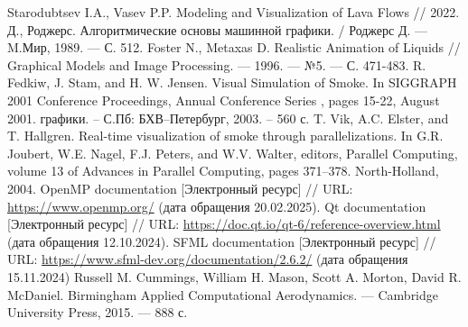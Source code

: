 \begin{thebibliography}{}
	 Starodubtsev I.A., Vasev P.P. Modeling and Visualization of Lava Flows // 2022.
	 Д., Роджерс. Алгоритмические основы машинной графики. / Роджерс Д.
	— M.Мир, 1989. — С. 512. 
	 Foster N., Metaxas D. Realistic Animation of Liquids // Graphical Models and Image Processing. --- 1996. --- №5. --- С. 471-483.
	R. Fedkiw, J. Stam, and H. W. Jensen. Visual Simulation of Smoke. In SIGGRAPH 2001 Conference Proceedings, Annual Conference Series , pages 15-22, August 2001.
	графики. – С.Пб: БХВ–Петербург, 2003. – 560 с.
	 T. Vik, A.C. Elster, and T. Hallgren. Real-time visualization of smoke through parallelizations. In
	G.R. Joubert, W.E. Nagel, F.J. Peters, and W.V. Walter, editors, Parallel Computing, volume 13 of Advances in Parallel Computing, pages 371–378. North-Holland, 2004.
	 OpenMP documentation [Электронный ресурс] // URL: \url{https://www.openmp.org/} (дата обращения 20.02.2025).
	 Qt documentation [Электронный ресурс] // URL: \url{https://doc.qt.io/qt-6/reference-overview.html} (дата обращения 12.10.2024).
	 SFML documentation [Электронный ресурс] // URL: \url{https://www.sfml-dev.org/documentation/2.6.2/} (дата обращения 15.11.2024)
	 Russell M. Cummings, William H. Mason, Scott A. Morton, David R. McDaniel. Birmingham Applied Computational Aerodynamics. --- Cambridge University Press,  2015. --- 888 с.
\end{thebibliography}
